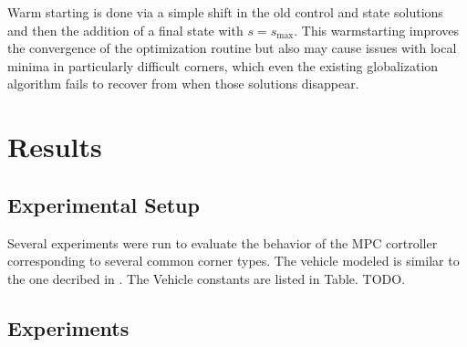 \documentclass[conference,11pt]{IEEEtran}
\begin{document}
Warm starting is done via a simple shift in the old control and state solutions and then the addition of a final state with $s = s_{\mathrm{max}}$. This warmstarting improves the convergence
of the optimization routine but also may cause issues with local minima in particularly difficult corners, which even the existing globalization algorithm fails to recover from when those solutions
disappear.

\section{Results}
\subsection{Experimental Setup}

Several experiments were run to evaluate the behavior of the MPC cortroller corresponding to several common corner types. The vehicle modeled is similar to the one decribed in \cite{LOT20147559}.
The Vehicle constants are listed in Table. TODO.

\subsection{Experiments}
\end{document}

